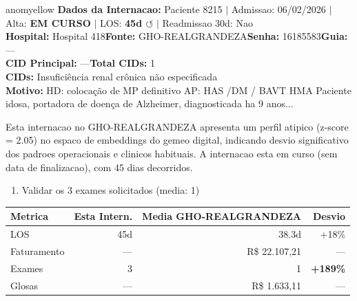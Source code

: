 \documentclass[a4paper,10pt]{article}
\begin{document}
\newpage

\begin{anomalycard}[Internacao 11758 | GHO-REALGRANDEZA | MODERADO (z=2.05)]{anomyellow}
\textbf{Dados da Internacao:} Paciente 8215 $\mid$ Admissao: 06/02/2026 $\mid$ Alta: \textcolor{anomorange}{\textbf{EM CURSO}} $\mid$ LOS: \textbf{45d \textcolor{anomorange}{$\circlearrowleft$}} $\mid$ Readmissao 30d: Nao\\
\textbf{Hospital:} Hospital 418\quad\textbf{Fonte:} GHO-REALGRANDEZA\quad\textbf{Senha:} 16185583\quad\textbf{Guia:} ---\\
\textbf{CID Principal:} {\small ---}\quad\textbf{Total CIDs:} 1\\

\textbf{CIDs:} {\scriptsize Insuficiência renal crônica não especificada}\\

\textbf{Motivo:} {\scriptsize HD: colocação de MP definitivo AP: HAS /DM / BAVT  HMA Paciente idosa, portadora de doença de Alzheimer, diagnosticada ha 9 anos...}\\

\vspace{2pt}\begin{tcolorbox}[colback=severityred!20,colframe=anomyellow,title={\textbf{Interpretacao de Negocio}},fonttitle=\bfseries\small,left=4pt,right=4pt,top=3pt,bottom=3pt]
{\small Esta internacao no GHO-REALGRANDEZA apresenta um perfil atipico (z-score = 2.05) no espaco de embeddings do gemeo digital, indicando desvio significativo dos padroes operacionais e clinicos habituais. A internacao esta em curso (sem data de finalizacao), com 45 dias decorridos.}
\end{tcolorbox}
\begin{tcolorbox}[colback=severityyellow!30,colframe=anomorange,title={\textbf{Recomendacoes Especificas}},fonttitle=\bfseries\small,left=4pt,right=4pt,top=3pt,bottom=3pt]
\begin{enumerate}[nosep,leftmargin=16pt]
\item {\small Validar os 3 exames solicitados (media: 1)}
\end{enumerate}
\end{tcolorbox}
\begin{center}\begin{tabular}{l r r r}\toprule\textbf{Metrica} & \textbf{Esta Intern.} & \textbf{Media GHO-REALGRANDEZA} & \textbf{Desvio} \\\midrule
LOS & 45d & 38.3d & +18\% \\
Faturamento & --- & R\$ 22.107,21 & --- \\
Exames & 3 & 1 & \textcolor{anomred}{\textbf{+189\%}} \\
Glosas & --- & R\$ 1.633,11 & --- \\
\bottomrule\end{tabular}\end{center}


\end{anomalycard}
\end{document}
